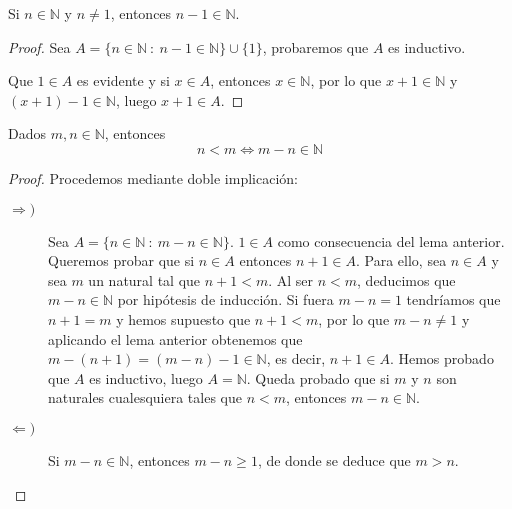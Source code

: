 \begin{lema}
    Si $n \in \mathbb{N}$ y $n \neq 1$, entonces $n-1 \in \mathbb{N}$.
\end{lema}
\begin{proof}
    Sea $A=\{n \in \mathbb{N}~:~ n-1 \in \mathbb{N}\}\cup \{1\}$, probaremos que $A$ es inductivo.
    
    Que $1 \in A$ es evidente y si $x \in A$, entonces $x \in \mathbb{N}$, por lo que $x+1 \in \mathbb{N}$
    y $(x+1)-1 \in \mathbb{N}$, luego $x+1 \in A$.
\end{proof}


\begin{prop}\label{prop:2.1.7}
    Dados $m,n \in \mathbb{N}$, entonces
    \begin{equation*}
        n < m \Longleftrightarrow m-n \in \mathbb{N}
    \end{equation*}
\end{prop}
\begin{proof} Procedemos mediante doble implicación:

    \begin{description}
        \item[$\Longrightarrow)$]
            Sea $A = \{n \in \mathbb{N}~:~ m-n \in \mathbb{N}\}$.
            \newline
            \newline
            $1 \in A$ como consecuencia del lema anterior. Queremos probar que si $n \in A$ entonces
            $n+1 \in A$.
            \newline
            \newline
            Para ello, sea $n \in A$ y sea $m$ un natural tal que $n+1 < m$. Al ser $n < m$,
            deducimos que $m-n \in \mathbb{N}$ por hipótesis de inducción. Si fuera $m-n=1$ tendríamos
            que $n+1=m$ y hemos supuesto que $n+1 < m$, por lo que $m-n \neq 1$ y aplicando el lema anterior
            obtenemos que $m-(n+1)=(m-n)-1 \in \mathbb{N}$, es decir, $n+1 \in A$.
            \newline
            \newline
            Hemos probado que $A$ es inductivo, luego $A = \mathbb{N}$. Queda probado que si $m$ y $n$ son
            naturales cualesquiera tales que $n < m$, entonces $m-n \in \mathbb{N}$.
            
        \item[$\Longleftarrow)$]
            Si $m-n \in \mathbb{N}$, entonces $m-n \geq 1$, de donde se deduce que $m > n$.
    \end{description}
\end{proof}


